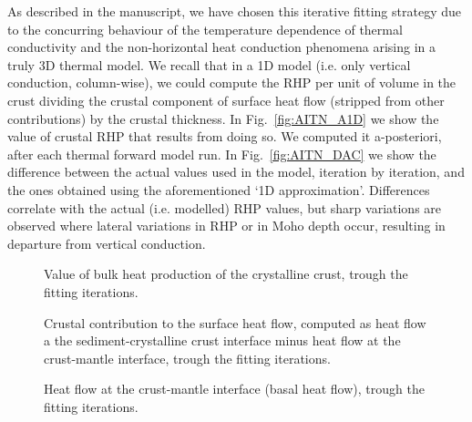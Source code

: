 {\begin{subappendices}
As described in the manuscript, we have chosen this iterative fitting strategy due to the concurring behaviour of the temperature dependence of thermal conductivity and the non-horizontal heat conduction phenomena arising in a truly 3D thermal model.
We recall that in a 1D model (i.e. only vertical conduction, column-wise), we could compute the RHP per unit of volume in the crust dividing the crustal component of surface heat flow (stripped from other contributions) by the crustal thickness.
In Fig.~\ref{fig:AITN_A1D} we show the value of crustal RHP that results from doing so.
We computed it a-posteriori, after each thermal forward model run.
In Fig.~\ref{fig:AITN_DAC} we show the difference between the actual values used in the model, iteration by iteration, and the ones obtained using the aforementioned `1D approximation'.
Differences correlate with the actual (i.e. modelled) RHP values, but sharp variations are observed where lateral variations in RHP or in Moho depth occur, resulting in departure from vertical conduction.

\FloatBarrier

\begin{figure}
	\begin{adjustbox}{center}
	\end{adjustbox}
	\caption{Value of bulk heat production of the crystalline crust, trough the fitting iterations.}
	\label{fig:AITN_ACC}
\end{figure}

\begin{figure}
	\begin{adjustbox}{center}
	\end{adjustbox}
	\caption{Crustal contribution to the surface heat flow, computed as heat flow a the sediment-crystalline crust interface minus heat flow at the crust-mantle interface, trough the fitting iterations.}
	\label{fig:AITN_Qc}
\end{figure}

\begin{figure}
	\begin{adjustbox}{center}
	\end{adjustbox}
	\caption{Heat flow at the crust-mantle interface (basal heat flow), trough the fitting iterations.}
	\label{fig:AITN_Qm}
\end{figure}


\end{subappendices}}
